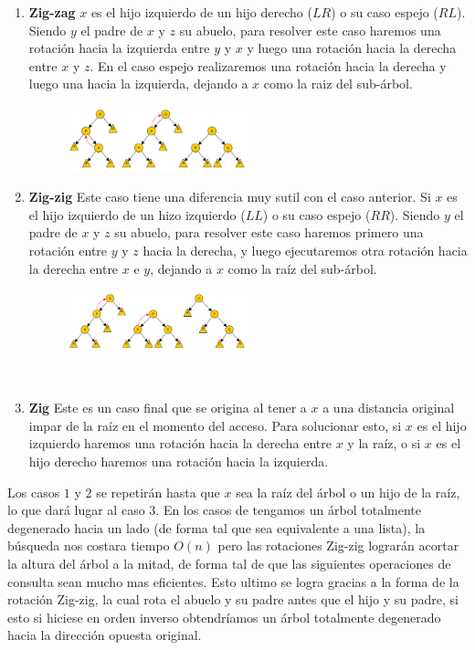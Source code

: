 \documentclass[10pt, a4paper]{report}
\begin{document}
\begin{enumerate}
 \item \textbf{Zig-zag} $x$ es el hijo izquierdo de un hijo derecho ($LR$) o su caso espejo ($RL$). Siendo $y$ el padre de $x$ y $z$ su abuelo, para resolver este caso haremos una rotaci\'on hacia la izquierda entre $y$ y $x$ y luego una rotaci\'on hacia la derecha entre $x$ y $z$. En el caso espejo realizaremos una rotaci\'on hacia la derecha y luego una hacia la izquierda, dejando a $x$ como la raiz del sub-\'arbol.
 
 \begin{figure}
 \centering
 \includegraphics[width=0.5\textwidth]{ZigZagSplay.pdf}
 \end{figure}
 
 \item \textbf{Zig-zig} Este caso tiene una diferencia muy sutil con el caso anterior. Si $x$ es el hijo izquierdo de un hizo izquierdo ($LL$) o su caso espejo ($RR$). Siendo $y$ el padre de $x$ y $z$ su abuelo, para resolver este caso haremos primero una rotaci\'on entre $y$ y $z$ hacia la derecha, y luego ejecutaremos otra rotaci\'on hacia la derecha entre $x$ e $y$, dejando a $x$ como la ra\'iz del sub-\'arbol.
 
 \begin{figure}
 \centering
 \includegraphics[width=0.5\textwidth]{ZigZigSplay.pdf}
 \end{figure}
 
 ~
 
 \item \textbf{Zig} Este es un caso final que se origina al tener a $x$ a una distancia original impar de la ra\'iz en el momento del acceso. Para solucionar esto, si $x$ es el hijo izquierdo haremos una rotaci\'on hacia la derecha entre $x$ y la ra\'iz, o si $x$ es el hijo derecho haremos una rotaci\'on hacia la izquierda.
\end{enumerate}

Los casos $1$ y $2$ se repetir\'an hasta que $x$ sea la ra\'iz del \'arbol o un hijo de la ra\'iz, lo que dar\'a lugar al caso $3$. En los casos de tengamos un \'arbol totalmente degenerado hacia un lado (de forma tal que sea equivalente a una lista), la b\'usqueda nos costara tiempo $O(n)$ pero las rotaciones Zig-zig lograr\'an acortar la altura del \'arbol a la mitad, de forma tal de que las siguientes operaciones de consulta sean mucho mas eficientes. Esto ultimo se logra gracias a la forma de la rotaci\'on Zig-zig, la cual rota el abuelo y su padre antes que el hijo y su padre, si esto si hiciese en orden inverso obtendr\'iamos un \'arbol totalmente degenerado hacia la direcci\'on opuesta original. 
\end{document}

